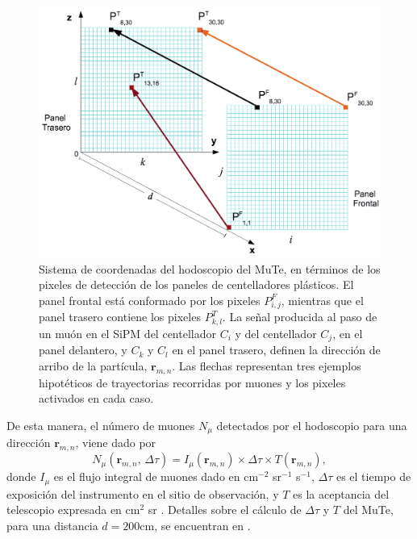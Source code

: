 \documentclass[12pt,oneside,openany,letter]{book}
\begin{document}
\begin{figure}[h!]
    \centering       
    \includegraphics[scale=0.5]{images/sistema_coo.png}
    
   \caption[Sistema de coordenadas del hodoscopio del MuTe]{Sistema de coordenadas del hodoscopio del MuTe, en términos de los pixeles de detección de los paneles de centelladores plásticos. El panel frontal está conformado por los pixeles $P^{F}_{i,j}$, mientras que el panel trasero contiene los pixeles $P^{T}_{k,l}$. La señal producida al paso de un muón en el SiPM del centellador $C_i$ y del centellador $C_j$, en el panel delantero, y $C_k$ y $C_l$ en el panel trasero, definen la dirección de arribo de la partícula, $\mathbf{r}_{m,n}$. Las flechas representan tres ejemplos hipotéticos de trayectorias recorridas por muones y los pixeles activados en cada caso.}\label{sistema_coo}
\end{figure}

De esta manera, el número de muones $N_{\mu}$ detectados por el hodoscopio para una dirección $\mathbf{r}_{m,n}$, viene dado por
\begin{equation}
\label{ecNumero}
N_{\mu}(\mathbf{r}_{m,n}, \, \Delta \tau)= I_{\mu}(\mathbf{r}_{m,n}) \times \Delta \tau \times T(\mathbf{r}_{m,n}),
\end{equation}
donde $I_{\mu}$ es el flujo integral de muones dado en cm$^{-2}$ sr$^{-1}$ s$^{-1}$,  $\Delta \tau$ es el tiempo de exposici\'on del instrumento en el sitio de observaci\'on, y $T$ es la aceptancia del telescopio expresada en cm$^2$ sr \cite{lesparre-etal2012-gim}. Detalles sobre el cálculo de $\Delta \tau$ y $T$ del MuTe, para una distancia $d=200$cm, se encuentran en \cite{MuTeSites}.
\end{document}
